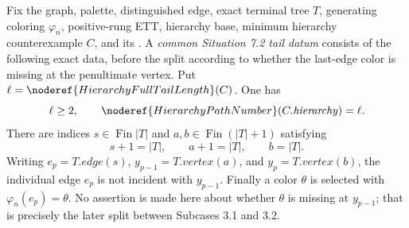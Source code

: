 \begin{definition}
Fix the graph, palette, distinguished edge, exact terminal tree \(T\),
generating coloring \(\varphi_n\), positive-rung ETT, hierarchy base,
minimum hierarchy counterexample \(C\), and its
.  A \emph{common
Situation 7.2 tail datum} consists of the following exact data, before the
split according to whether the last-edge color is missing at the penultimate
vertex.  Put \(\ell=\noderef{HierarchyFullTailLength}(C)\).  One has
\[
 \ell\geq2,
 \qquad
 \noderef{HierarchyPathNumber}(C.\mathit{hierarchy})=\ell .
\]
There are indices \(s\in\operatorname{Fin}|T|\) and
\(a,b\in\operatorname{Fin}(|T|+1)\) satisfying
\[
 s+1=|T|,\qquad a+1=|T|,\qquad b=|T|.
\]
Writing \(e_p=T.\mathit{edge}(s)\),
\(y_{p-1}=T.\mathit{vertex}(a)\), and
\(y_p=T.\mathit{vertex}(b)\), the individual edge \(e_p\) is not incident
with \(y_{p-1}\).  Finally a color \(\theta\) is selected with
\(\varphi_n(e_p)=\theta\).  No assertion is made here about whether
\(\theta\) is missing at \(y_{p-1}\); that is precisely the later split
between Subcases 3.1 and 3.2.
\end{definition}

